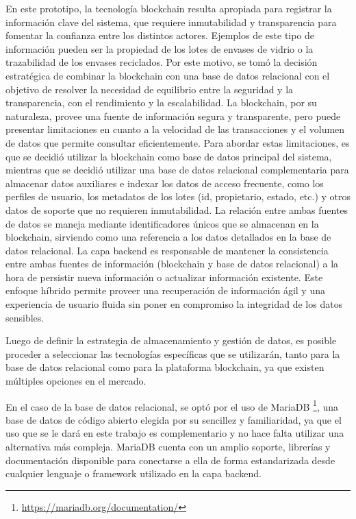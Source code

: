 En este prototipo, la tecnología blockchain resulta apropiada para registrar la información clave del sistema, que requiere inmutabilidad y transparencia para fomentar la confianza entre los distintos actores. Ejemplos de este tipo de información pueden ser la propiedad de los lotes de envases de vidrio o la trazabilidad de los envases reciclados. Por este motivo, se tomó la decisión estratégica de combinar la blockchain con una base de datos relacional con el objetivo de resolver la necesidad de equilibrio entre la seguridad y la transparencia, con el rendimiento y la escalabilidad. La blockchain, por su naturaleza, provee una fuente de información segura y transparente, pero puede presentar limitaciones en cuanto a la velocidad de las transacciones y el volumen de datos que permite consultar eficientemente. Para abordar estas limitaciones, es que se decidió utilizar la blockchain como base de datos principal del sistema, mientras que se decidió utilizar una base de datos relacional complementaria para almacenar datos auxiliares e indexar los datos de acceso frecuente, como los perfiles de usuario, los metadatos de los lotes (id, propietario, estado, etc.) y otros datos de soporte que no requieren inmutabilidad. La relación entre ambas fuentes de datos se maneja mediante identificadores únicos que se almacenan en la blockchain, sirviendo como una referencia a los datos detallados en la base de datos relacional. La capa backend es responsable de mantener la consistencia entre ambas fuentes de información (blockchain y base de datos relacional) a la hora de persistir nueva información o actualizar información existente. Este enfoque híbrido permite proveer una recuperación de información ágil y una experiencia de usuario fluida sin poner en compromiso la integridad de los datos sensibles.

Luego de definir la estrategia de almacenamiento y gestión de datos, es posible proceder a seleccionar las tecnologías específicas que se utilizarán, tanto para la base de datos relacional como para la plataforma blockchain, ya que existen múltiples opciones en el mercado.

En el caso de la base de datos relacional, se optó por el uso de MariaDB \footnote{\url{https://mariadb.org/documentation/}}, una base de datos de código abierto elegida por su sencillez y familiaridad, ya que el uso que se le dará en este trabajo es complementario y no hace falta utilizar una alternativa más compleja. MariaDB cuenta con un amplio soporte, librerías y documentación disponible para conectarse a ella de forma estandarizada desde cualquier lenguaje o framework utilizado en la capa backend.


